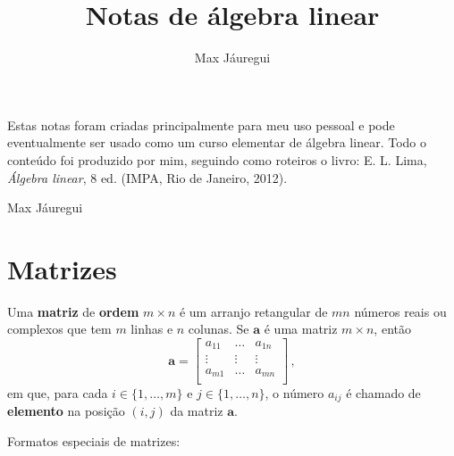 \documentclass[12pt,a4paper]{report}
\title{Notas de álgebra linear}
\author{Max Jáuregui}
\newcommand{\tb}{\textbf}
\newcommand{\mb}{\mathbf}
\begin{document}
\maketitle
  Estas notas foram criadas principalmente para meu uso pessoal e pode eventualmente ser usado como um curso elementar de álgebra linear. Todo o conteúdo foi produzido por mim, seguindo como roteiros o livro: E. L. Lima, \textit{Álgebra linear}, 8 ed. (IMPA, Rio de Janeiro, 2012).

  \begin{flushright}
    Max Jáuregui
  \end{flushright}
\tableofcontents

\chapter{Matrizes}

Uma \tb{matriz} de \tb{ordem} $m\times n$ é um arranjo retangular de $mn$ números reais ou complexos que tem $m$ linhas e $n$ colunas. Se $\mb{a}$ é uma matriz $m\times n$, então
$$\mb{a}=\begin{bmatrix}
  a_{11}&\ldots&a_{1n}\\
  \vdots&\vdots&\vdots\\
  a_{m1}&\ldots&a_{mn}\\
\end{bmatrix}\,,$$
em que, para cada $i\in\{1,\ldots,m\}$ e $j\in\{1,\ldots,n\}$, o número $a_{ij}$ é chamado de \tb{elemento} na posição $(i,j)$ da matriz $\mb{a}$.

Formatos especiais de matrizes:
\end{document}
